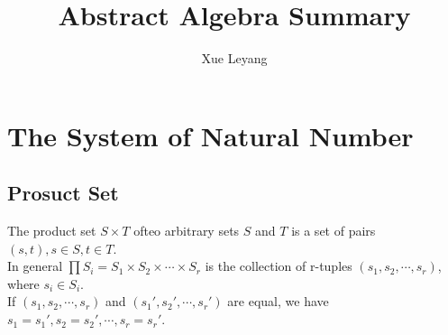 
\usepackage{natbib}
\usepackage{multirow}
\usepackage{indentfirst}
\renewcommand\thesection{\arabic {section}}
\setlength{\parindent}{2em}

\title{Abstract Algebra Summary}
\author{Xue Leyang}


	\maketitle
	\setcounter{page}{0} 
	\thispagestyle{empty}
	\section{The System of Natural Number}
	\subsection{Prosuct Set}
		\begin{definition}
		The product set $S \times T$ ofteo arbitrary sets $S$ and $T$ is a set of pairs $(s,t), s\in S, t\in T$.\\
		In general $\prod S_i = S_1\times S_2\times\cdots\times S_r$ is the collection of r-tuples $(s_1, s_2, \cdots, s_r)$, where $s_i\in S_i$.\\
		If $(s_1, s_2, \cdots, s_r)$ and $(s_1', s_2', \cdots, s_r')$ are equal, we have $s_1=s_1',s_2=s_2', \cdots, s_r=s_r'$.
		\end{definition}
